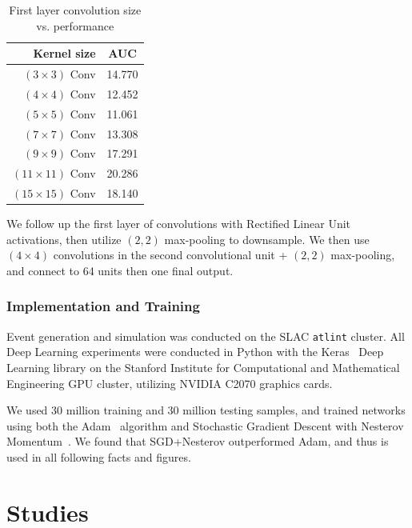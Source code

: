 \documentclass{article}
\begin{document}
\begin{table}[h!]
  \centering
  \begin{tabular}{r|c}
    \bfseries Kernel size & \bfseries AUC \\ 
    \hline
    $(3 \times 3)$ Conv & 14.770 \\
    \hline
    $(4 \times 4)$ Conv & 12.452 \\
    \hline
    $(5 \times 5)$ Conv & 11.061 \\
    \hline
    $(7 \times 7)$ Conv & 13.308 \\
    \hline
    $(9 \times 9)$ Conv & 17.291 \\
    \hline
    $(11 \times 11)$ Conv & 20.286 \\
    \hline
    $(15 \times 15)$ Conv & 18.140 \\
  \end{tabular}
  \caption{First layer convolution size vs. performance}
  \label{tab:kernelsize}
\end{table}

We follow up the first layer of convolutions with Rectified Linear Unit activations, then utilize $(2, 2)$ max-pooling to downsample. We then use $(4\times 4)$ convolutions in the second convolutional unit + $(2, 2)$ max-pooling, and connect to 64 units then one final output.

\subsubsection{Implementation and Training} %
\label{ssub:implementation_and_training}


Event generation and simulation was conducted on the SLAC \texttt{atlint} cluster. All Deep Learning experiments were conducted in Python with the Keras~\cite{Keras} Deep Learning library on the Stanford Institute for Computational and Mathematical Engineering GPU cluster, utilizing NVIDIA C2070 graphics cards. 

We used 30 million training and 30 million testing samples, and trained networks using both the Adam~\cite{DBLP:journals/corr/KingmaB14} algorithm and Stochastic Gradient Descent with Nesterov Momentum~\cite{Nesterov:1983wy}. We found that SGD+Nesterov outperformed Adam, and thus is used in all following facts and figures.



\section{Studies} %
\label{sec:studies}
\end{document}
